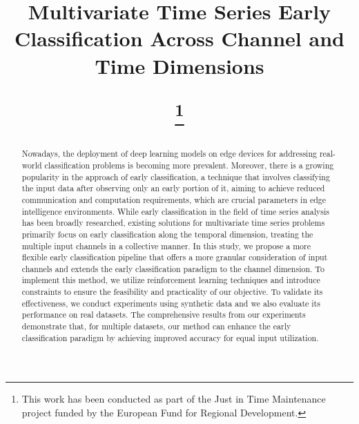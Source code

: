 \documentclass[conference]{IEEEtran}
\begin{document}
\title{Multivariate Time Series Early Classification Across Channel and Time Dimensions

\thanks{This work has been conducted as part of the Just in
Time Maintenance project funded by the European Fund for
Regional Development.}
}

\author{
\and
{}
\and
{}
\and
{}
}


\maketitle

\begin{abstract}

Nowadays, the deployment of deep learning models on edge devices for addressing real-world classification problems is becoming more prevalent. Moreover, there is a growing popularity in the approach of early classification, a technique that involves classifying the input data after observing only an early portion of it, aiming to achieve reduced communication and computation requirements, which are crucial parameters in edge intelligence environments. While early classification in the field of time series analysis has been broadly researched, existing solutions for multivariate time series problems primarily focus on early classification along the temporal dimension, treating the multiple input channels in a collective manner. In this study, we propose a more flexible early classification pipeline that offers a more granular consideration of input channels and extends the early classification paradigm to the channel dimension. To implement this method, we utilize reinforcement learning techniques and introduce constraints to ensure the feasibility and practicality of our objective. To validate its effectiveness, we conduct experiments using synthetic data and we also evaluate its performance on real datasets. The comprehensive results from our experiments demonstrate that, for multiple datasets, our method can enhance the early classification paradigm by achieving improved accuracy for equal input utilization.
\end{abstract}
\end{document}
